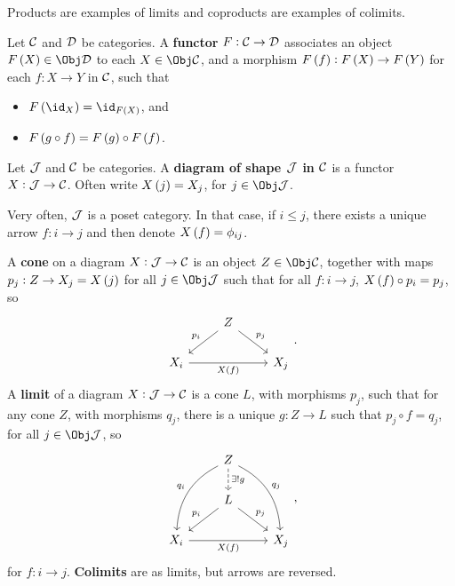 Products are examples of limits and coproducts are examples of colimits.

\pagebreak

\begin{definition*}
Let $ \mathcal{C} $ and $ \mathcal{D} $ be categories. A \textbf{functor} $ F : \mathcal{C} \to \mathcal{D} $ associates an object $ F\br{X} \in \Obj \DDD $ to each $ X \in \Obj \CCC $, and a morphism $ F\br{f} : F\br{X} \to F\br{Y} $ for each $ f : X \to Y $ in $ \mathcal{C} $, such that
\begin{itemize}
\item $ F\br{\id_X} = \id_{F\br{X}} $, and
\item $ F\br{g \circ f} = F\br{g} \circ F\br{f} $.
\end{itemize}
\end{definition*}

\begin{definition*}
Let $ \mathcal{J} $ and $ \mathcal{C} $ be categories. A \textbf{diagram of shape $ \mathcal{J} $ in $ \mathcal{C} $} is a functor $ X : \mathcal{J} \to \mathcal{C} $. Often write $ X\br{j} = X_j $, for $ j \in \Obj \JJJ $.
\end{definition*}

Very often, $ \mathcal{J} $ is a poset category. In that case, if $ i \le j $, there exists a unique arrow $ f : i \to j $ and then denote $ X\br{f} = \phi_{ij} $.

\begin{definition*}
A \textbf{cone} on a diagram $ X : \mathcal{J} \to \mathcal{C} $ is an object $ Z \in \Obj \CCC $, together with maps $ p_j : Z \to X_j = X\br{j} $ for all $ j \in \Obj \JJJ $ such that for all $ f : i \to j $, $ X\br{f} \circ p_i = p_j $, so
$$
\begin{tikzcd}
& Z \arrow{dl}[swap]{p_i} \arrow{dr}{p_j} & \\
X_i \arrow{rr}[swap]{X\br{f}} & & X_j
\end{tikzcd}.
$$
A \textbf{limit} of a diagram $ X : \mathcal{J} \to \mathcal{C} $ is a cone $ L $, with morphisms $ p_j $, such that for any cone $ Z $, with morphisms $ q_j $, there is a unique $ g : Z \to L $ such that $ p_j \circ f = q_j $, for all $ j \in \Obj \JJJ $, so
$$
\begin{tikzcd}
& Z \arrow[dashed]{d}{\exists !g} \arrow[bend right=30]{ddl}[swap]{q_i} \arrow[bend left=30]{ddr}{q_j} & \\
& L \arrow{dl}[swap]{p_i} \arrow{dr}{p_j} & \\
X_i \arrow{rr}[swap]{X\br{f}} & & X_j
\end{tikzcd},
$$
for $ f : i \to j $. \textbf{Colimits} are as limits, but arrows are reversed.
\end{definition*}

